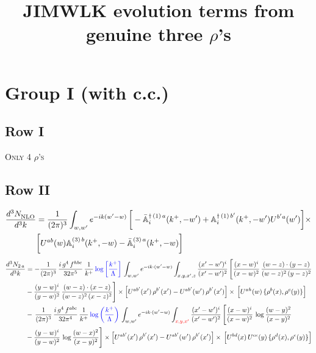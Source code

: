 \documentclass[9pt]{article}
\title{JIMWLK evolution terms from genuine three $\rho$'s}
\author{}
\date{}
\def\mf#1{\mathbb{#1}}
\newcommand{\chg}[1]{{\color{red}#1}}
\numberwithin{equation}{section}
\begin{document}
\maketitle
\section{Group I (with c.c.)}
\subsection{Row I}
\textsc{Only 4 $\rho$'s}
\subsection{Row II}
\begin{align}
    \frac{d^{3}N_{\rm NLO}^{\rm}}{d^{3}k} &  = \frac{1}{(2\pi)^{3}}  \int_{w, w^\prime} e^{-ik(w^\prime-w)}\,\bigg[-\bar{\mf{A}}^{\dagger\,(1)\,a}_{i}(k^{+},-w^{\prime})+\mf{A}^{\dagger\, (1)\, b^{\prime}}_{i}(k^{+},-w^{\prime})U^{b^{\prime}a}(w^{\prime})\bigg]\times \notag \\ & \bigg[U^{ab}(w)\mf{A}^{(3)\, b}_{i}(k^{+},- w)-\Bar{\mf{A}}^{(3)\, a}_{i}(k^{+}, - w)\bigg]\nonumber
\end{align}
\begin{align}
    \frac{d^{3}N_{2\,a}}{d^{3}k} & = -\frac{1}{(2\pi)^{3}}\,\frac{i\,g^{4}\,f^{hbc}}{32\pi^{5}}\,\frac{1}{k^{+}}\,{\color{blue}\log{\left[\frac{k^{+}}{\Lambda}\right]}}\,
\int_{w,w'} e^{-ik\cdot(w'-w)}\int_{x,y,x',z}\frac{(x'-w')^{i}}{(x'-w')^{2}}\,\Bigg[\frac{(x-w)^{i}}{(x-w)^{2}}\, \frac{(w-z)\cdot (y-z)}{(w-z)^{2}\,(y-z)^{2}}\notag \\ & - \frac{(y-w)^{i}}{(y-w)^{2}}\, \frac{(w-z)\cdot (x-z)}{(w-z)^{2}\,(x-z)^{2}}\Bigg]\times\Big[U^{ab'}(x')\,\rho^{b'}(x')-U^{ab'}(w')\,\rho^{b'}(x')\Big]\times\, \Big[U^{ah}(w)\,\{\rho^{b}(x),\rho^{c}(y)\}\Big]\notag \\ &  -\,\frac{1}{(2\pi)^{3}}\,\frac{i\,g^{4}\,f^{abc}}{32\pi^{4}}\,\frac{1}{k^{+}}\,{\color{blue}\log\left(\frac{k^{+}}{\Lambda}\right)}\,
\int_{w,w'} e^{-ik\cdot(w'-w)}\int_{\chg{x,y,x'}}\frac{(x'-w')^{i}}{(x'-w')^{2}}\,\Bigg[\frac{(x-w)^{i}}{(x-w)^{2}}\,\log\frac{(w-y)^{2}}{(x-y)^{2}}\notag \\ & -\frac{(y-w)^{i}}{(y-w)^{2}}\,\log\frac{(w-x)^{2}}{(x-y)^{2}}\Bigg]\times \Big[U^{ab'}(x')\,\rho^{b'}(x')-U^{ab'}(w')\,\rho^{b'}(x')\Big]\times\, \Big[U^{bd}(x)\,U^{ce}(y)\,\{\rho^{d}(x),\rho^{e}(y)\}\Big]
\end{align}
\end{document}
